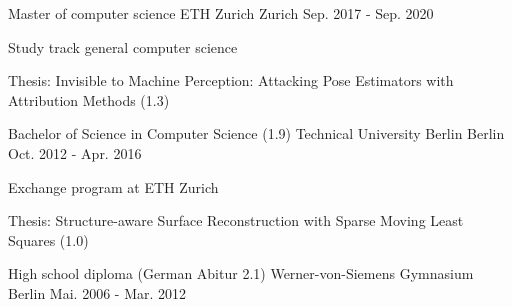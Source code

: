 

\begin{cventries}

  \cventry
    {Master of computer science} %
    {ETH Zurich} %
    {Zurich} %
    {Sep. 2017 - Sep. 2020} %
    {
      \begin{cvitems} %
        \item {Study track general computer science}
        \item {Thesis: Invisible to Machine Perception: Attacking Pose Estimators with Attribution Methods (1.3)}
      \end{cvitems}
    }


  \cventry
    {Bachelor of Science in Computer Science (1.9)} %
    {Technical University Berlin} %
    {Berlin} %
    {Oct. 2012 - Apr. 2016} %
    {
      \begin{cvitems} %
        \item {Exchange program at ETH Zurich}
        \item {Thesis: Structure-aware Surface Reconstruction with Sparse Moving Least Squares (1.0)}
      \end{cvitems}
    }


  \cventry
    {High school diploma (German Abitur 2.1)} %
    {Werner-von-Siemens Gymnasium} %
    {Berlin} %
    {Mai. 2006 - Mar. 2012} %
    {}

\end{cventries}
